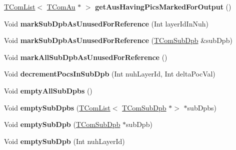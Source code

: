 \begin{DoxyCompactItemize}
\item 
\mbox{\label{class_t_com_pic_lists_a9a085dc518d6b9d20f0c18f03efed66c}} 
\hyperlink{class_t_com_list}{T\+Com\+List}$<$ \hyperlink{class_t_com_au}{T\+Com\+Au} $\ast$ $>$ {\bfseries get\+Aus\+Having\+Pics\+Marked\+For\+Output} ()
\item 
\mbox{\label{class_t_com_pic_lists_a30207dfa0b8376bab33b21bface2b2a9}} 
Void {\bfseries mark\+Sub\+Dpb\+As\+Unused\+For\+Reference} (Int layer\+Id\+In\+Nuh)
\item 
\mbox{\label{class_t_com_pic_lists_a9274ff81000bab7c2b4ea28c6195addc}} 
Void {\bfseries mark\+Sub\+Dpb\+As\+Unused\+For\+Reference} (\hyperlink{class_t_com_sub_dpb}{T\+Com\+Sub\+Dpb} \&sub\+Dpb)
\item 
\mbox{\label{class_t_com_pic_lists_a6aadb461844e2c52a94b7063c1c88bda}} 
Void {\bfseries mark\+All\+Sub\+Dpb\+As\+Unused\+For\+Reference} ()
\item 
\mbox{\label{class_t_com_pic_lists_af9cb5b7410da689183b211c26030fe8e}} 
Void {\bfseries decrement\+Pocs\+In\+Sub\+Dpb} (Int nuh\+Layer\+Id, Int delta\+Poc\+Val)
\item 
\mbox{\label{class_t_com_pic_lists_ae37ddb0e333aca5163b6bda50cc42e99}} 
Void {\bfseries empty\+All\+Sub\+Dpbs} ()
\item 
\mbox{\label{class_t_com_pic_lists_aa53033a217fdca5fa27198dcf9f91dd7}} 
Void {\bfseries empty\+Sub\+Dpbs} (\hyperlink{class_t_com_list}{T\+Com\+List}$<$ \hyperlink{class_t_com_sub_dpb}{T\+Com\+Sub\+Dpb} $\ast$$>$ $\ast$sub\+Dpbs)
\item 
\mbox{\label{class_t_com_pic_lists_aeb854949a73f2f197dd271915d54c0aa}} 
Void {\bfseries empty\+Sub\+Dpb} (\hyperlink{class_t_com_sub_dpb}{T\+Com\+Sub\+Dpb} $\ast$sub\+Dpb)
\item 
\mbox{\label{class_t_com_pic_lists_a99b871534cc8484875cb6932845511ee}} 
Void {\bfseries empty\+Sub\+Dpb} (Int nuh\+Layer\+Id)
\item 
$$
\end{DoxyCompactItemize}

